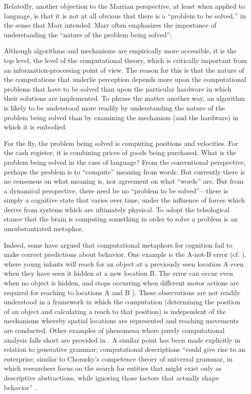   Relatedly, another objection to the Marrian perspective, at least when applied to language, is that it is not at all obvious that there is a “problem to be solved,” in the sense that Marr intended. Marr often emphasizes the importance of understanding the “nature of the problem being solved”:

Although algorithms and mechanisms are empirically more accessible, it is the top level, the level of the computational theory, which is critically important from an information-processing point of view. The reason for this is that the nature of the computations that underlie perception depends more upon the computational problems that have to be solved than upon the particular hardware in which their solutions are implemented. To phrase the matter another way, an algorithm is likely to be understood more readily by understanding the nature of the problem being solved than by examining the mechanism (and the hardware) in which it is embodied. \citep[27]{Marr1982}

  For the fly, the problem being solved is computing positions and velocities. For the cash register, it is combining prices of goods being purchased. What is the problem being solved in the case of language? From the conventional perspective, perhaps the problem is to “compute” meaning from words. But currently there is no consensus on what meaning is, nor agreement on what “words” are. But from a dynamical perspective, there need be no “problem to be solved”—there is simply a cognitive state that varies over time, under the influence of forces which derive from systems which are ultimately physical. To adopt the teleological stance that the brain is computing something in order to solve a problem is an unsubstantiated metaphor.

  Indeed, some have argued that computational metaphors for cognition fail to make correct predictions about behavior. One example is the A-not-B error (cf. \citealt{McClellandEtAl2010,SamuelsonEtAl2015}), where young infants will reach for an object at a previously seen location A even when they have seen it hidden at a new location B. The error can occur even when no object is hidden, and stops occurring when different motor actions are required for reaching to locations A and B \citep{SmithEtAl1999}). These observations are not readily understood in a framework in which the computation (determining the position of an object and calculating a reach to that position) is independent of the mechanisms whereby spatial locations are represented and reaching movements are conducted. Other examples of phenomena where purely computational analysis falls short are provided in \citet{SamuelsonEtAl2015}. A similar point has been made explicitly in relation to generative grammar; computational descriptions “could give rise to an enterprise, similar to Chomsky’s competence theory of universal grammar, in which researchers focus on the search for entities that might exist only as descriptive abstractions, while ignoring those factors that actually shape behavior” \citep{McClellandEtAl2010}.

